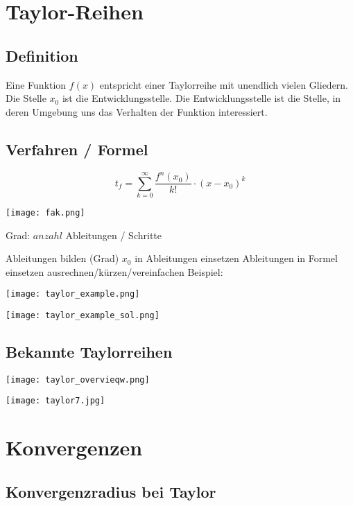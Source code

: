 \begin{multicols*}{3}
    \section{Taylor-Reihen}
    \subsection{Definition}
    {Eine Funktion $f(x)$ entspricht einer Taylorreihe mit unendlich vielen Gliedern. Die Stelle $x_0$ ist die Entwicklungsstelle. Die Entwicklungsstelle ist die Stelle, in deren Umgebung uns das Verhalten der Funktion interessiert.}
    \WhiteSpace
    \subsection{Verfahren / Formel}

    \begin{multicols*}{2}

        $$t_f = \sum_{k = 0}^{ \infty }\frac{f^n(x_0)}{k!}\cdot(x-x_0)^k$$

        \columnbreak
        \texttt{[image: fak.png]}

    \end{multicols*}
    {Grad: $anzahl$ Ableitungen / Schritte}

    { Ableitungen bilden (Grad)}
    \WhiteSpace
    { $x_0$ in Ableitungen einsetzen}
    \WhiteSpace
    { Ableitungen in Formel einsetzen}
    \WhiteSpace
    { ausrechnen/kürzen/vereinfachen}
    \WhiteSpace
    {Beispiel:}

    \texttt{[image: taylor\_example.png]}

    \texttt{[image: taylor\_example\_sol.png]}
    \vfill\null
    \columnbreak
    \subsection{Bekannte Taylorreihen}

    { \texttt{[image: taylor\_overvieqw.png]} }

    { \texttt{[image: taylor7.jpg]} }

    \vfill\null
    \columnbreak


    \section{Konvergenzen}
    \subsection{Konvergenzradius bei Taylor}


\end{multicols*}
